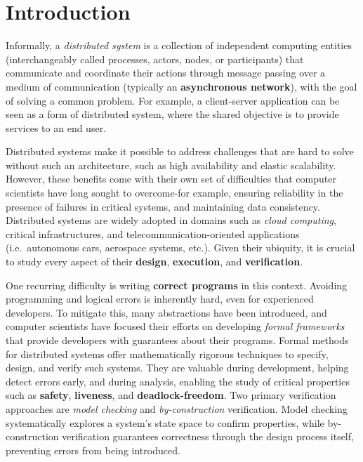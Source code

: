 \chapter{Introduction} \label{chap:intro}
\pagestyle{plain}
\setcounter{page}{1}

Informally, a \textit{distributed system} is a collection of independent 
computing entities (interchangeably called processes, actors, 
nodes, or participants) that communicate and coordinate their 
actions through message passing over a medium of communication 
(typically an \textbf{asynchronous network}), with the goal of solving a 
common problem. For example, a client-server application can be seen 
as a form of distributed system, where the shared objective is to provide 
services to an end user.

Distributed systems make it possible to address challenges that are
hard to solve without such an architecture, such as high availability
and elastic scalability. However, these benefits come with their own
set of difficulties that computer scientists have long sought to
overcome-for example, ensuring reliability in the presence of failures
in critical systems, and maintaining data consistency.
Distributed systems are 
widely adopted in domains such as \textit{cloud computing}, critical 
infrastructures, and telecommunication-oriented applications (i.e.\ 
autonomous cars, aerospace systems, etc.). Given their ubiquity, it is 
crucial to study every aspect of their \textbf{design}, \textbf{execution}, 
and \textbf{verification}.

One recurring difficulty is writing \textbf{correct programs} in this 
context. Avoiding programming and logical errors is inherently hard, even 
for experienced developers. To mitigate this, many abstractions have been 
introduced, and computer scientists have focused their efforts on developing 
\textit{formal frameworks} that provide developers with guarantees about 
their programs. Formal methods for distributed systems offer 
mathematically rigorous techniques to specify, design, and 
verify such systems. They are valuable during development, helping 
detect errors early, and during analysis, enabling the study of critical 
properties such as \textbf{safety}, \textbf{liveness}, and 
\textbf{deadlock-freedom}. Two primary verification approaches are 
\textit{model checking} and \textit{by-construction} verification. Model 
checking systematically explores a system's state space to confirm 
properties, while by-construction verification guarantees correctness 
through the design process itself, preventing errors from being introduced. 

